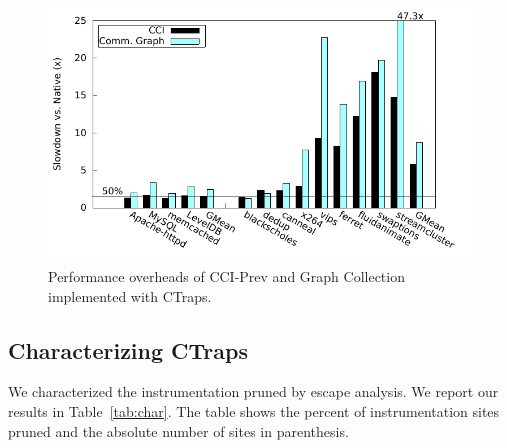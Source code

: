\documentclass[preprint,9pt]{sigplanconf}
\newcommand{\ctraps}{CTraps\xspace}
\begin{document}
\begin{figure}
\centering
\includegraphics[width=.9\columnwidth]{plots/appperf.pdf}
\caption{\label{fig:perfapps}Performance overheads of CCI-Prev and Graph Collection implemented with \ctraps.}
\end{figure}


\subsection{Characterizing \ctraps}
\label{sec:char}
We characterized the instrumentation pruned by escape analysis.  We report our
results in Table~\ref{tab:char}.  The table shows the percent of
instrumentation sites pruned and the absolute number of sites in parenthesis.
\end{document}

